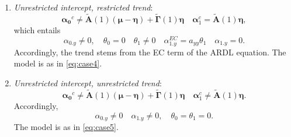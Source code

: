 \begin{enumerate}[I]
\item \textit{Unrestricted intercept, restricted trend}:
\begin{equation}\boldsymbol{\alpha_{0}}^{c}\neq\widetilde{\mathbf{A}}(1)(\boldsymbol{\mu}-\boldsymbol{\eta})+\widetilde{\boldsymbol{\Gamma}}(1)\boldsymbol{\eta}\enspace \enspace {\boldsymbol{\alpha}}_{1}^{c}=\widetilde{\mathbf{A}}(1)\boldsymbol{\eta},
\end{equation}
which entails
\begin{equation}
\alpha_{0.y} \neq 0,\enspace \enspace 
\theta_{0}=0 \enspace \enspace
\theta_{1}\neq 0\enspace\enspace
\alpha_{1.y}^{EC}=a_{yy}\theta_1\enspace\enspace 
\alpha_{1.y}=0.
\end{equation}
Accordingly, the trend stems from the EC term of the ARDL equation. The model is as in \eqref{eq:case4}.
\item \textit{Unrestricted intercept, unrestricted trend}:
\begin{equation}
\boldsymbol{\alpha_{0}}^{c}\neq\widetilde{\mathbf{A}}(1)(\boldsymbol{\mu}-\boldsymbol{\eta})+\widetilde{\boldsymbol{\Gamma}}(1)\boldsymbol{\eta} \enspace \enspace {\boldsymbol{\alpha}}_{1}^{c}\neq\widetilde{\mathbf{A}}(1)\boldsymbol{\eta}.
\end{equation}
Accordingly,
\begin{equation} \alpha_{0.y} \neq 0 \enspace \enspace\alpha_{1.y} \neq 0, \enspace \enspace\theta_{0}=\theta_{1}=0.
\end{equation}
The model is as in \eqref{eq:case5}.
\end{enumerate}
\newpage





\address{Gianmarco Vacca\\
  Department of Economic Policy. Università Cattolica del Sacro Cuore\\
  Largo Gemelli, 1, Milan.\\
  Italy\\
  (0000-0002-8996-5524)\\
  }

\address{Maria Zoia\\
  Department of Economic Policy. Università Cattolica del Sacro Cuore\\
  Largo Gemelli, 1, Milan.\\
  Italy\\
  (0000-0002-8169-781X)\\
  }
  
  \address{Stefano Bertelli\\
  CRO Area, Internal Validation and Controls Department, Operational Risk and ICAAP Internal Systems, 
  Intesa Sanpaolo, Milan\\
  Viale Stelvio, 55/57, Milan.\\
  Italy\\
  }

